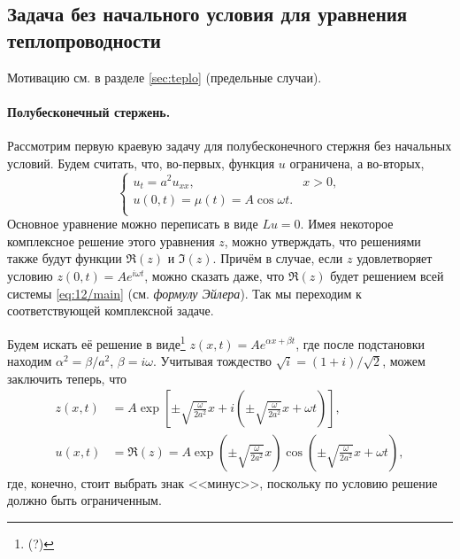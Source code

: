 \subsection{Задача без начального условия для уравнения теплопроводности}
Мотивацию см. в разделе \ref{sec:teplo} (предельные случаи). 
\paragraph{Полубесконечный стержень.} Рассмотрим первую
краевую задачу для полубесконечного стержня без начальных условий. Будем
считать, что, во-первых, функция $ u $ ограничена, а во-вторых,  
\begin{equation}
  \label{eq:12/main}
  \begin{cases}
    u_t = a^2u_{xx}, & x>0,\\
    u(0, t) = \mu(t) = A\cos\omega t.\\
  \end{cases}
\end{equation}
Основное уравнение можно переписать в виде $ Lu = 0  $. Имея некоторое комплексное
решение этого уравнения $ z $, можно утверждать, что решениями также будут функции $ \Re(z) $
и $ \Im(z) $. Причём в случае, если $ z $ удовлетворяет условию $ z(0, t) =
Ae^{i\omega t} $, можно сказать даже, что $ \Re(z) $ будет решением всей системы
\eqref{eq:12/main} (см. \emph{формулу Эйлера}). Так мы переходим к соответствующей комплексной задаче.

Будем искать её решение в виде\footnote{(?)} $ z(x, t) = Ae^{\alpha x + \beta t} $, где после
подстановки находим $ \alpha^2 = \beta/a^2 $, $ \beta = i\omega $. Учитывая
тождество $ \sqrt i = (1+i)/\sqrt 2 $, можем заключить теперь, что 
\begin{align*}
  z(x, t) &= A\exp \left[ \pm \sqrt{ \frac{\omega}{2a^2}} x + i \left( \pm
  \sqrt{\frac{\omega}{2a^2}}x + \omega t \right)  \right],\\
      u(x, t) &= \Re(z) =  A\exp \left( \pm \sqrt{ \frac{\omega}{2a^2}} x\right)
      \cos \left( \pm
  \sqrt{\frac{\omega}{2a^2}}x + \omega t \right),
\end{align*}
где, конечно, стоит выбрать знак <<минус>>, поскольку по условию решение должно
быть ограниченным.

